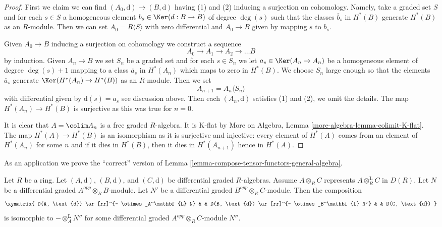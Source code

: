 \begin{proof}
First we claim we can find $(A_0, \text{d}) \to (B, \text{d})$
having (1) and (2) inducing a surjection on cohomology.
Namely, take a graded set $S$ and for each $s \in S$
a homogeneous element $b_s \in \Ker(d : B \to B)$ of degree $\deg(s)$
such that the classes $\overline{b}_s$ in $H^*(B)$
generate $H^*(B)$ as an $R$-module.
Then we can set $A_0 = R\langle S \rangle$ with zero differential
and $A_0 \to B$ given by mapping $s$ to $b_s$.

\medskip\noindent
Given $A_0 \to B$ inducing a surjection on cohomology we construct
a sequence
$$
A_0 \to A_1 \to A_2 \to \ldots B
$$
by induction. Given $A_n \to B$ we set $S_n$ be a graded set
and for each $s \in S_n$ we let $a_s \in \Ker(A_n \to A_n)$
be a homogeneous element of degree $\deg(s) + 1$
mapping to a class $\overline{a}_s$ in $H^*(A_n)$
which maps to zero in $H^*(B)$. We choose $S_n$ large enough
so that the elements $\overline{a}_s$ generate $\Ker(H^*(A_n) \to H^*(B))$
as an $R$-module. Then we set
$$
A_{n + 1} = A_n\langle S_n \rangle
$$
with differential given by $\text{d}(s) = a_s$ see discussion above.
Then each $(A_n, \text{d})$ satisfies (1) and (2), we omit the details.
The map $H^*(A_n) \to H^*(B)$ is surjective as this was true for $n = 0$.

\medskip\noindent
It is clear that $A = \colim A_n$ is a free graded $R$-algebra.
It is K-flat by More on Algebra, Lemma \ref{more-algebra-lemma-colimit-K-flat}.
The map $H^*(A) \to H^*(B)$ is an isomorphism as it is surjective
and injective: every element of $H^*(A)$ comes from an element of
$H^*(A_n)$ for some $n$ and if it dies in $H^*(B)$, then it dies
in $H^*(A_{n + 1})$ hence in $H^*(A)$.
\end{proof}

\noindent
As an application we prove the ``correct'' version of
Lemma \ref{lemma-compose-tensor-functors-general-algebra}.

\begin{lemma}
\label{lemma-compose-tensor-functors-tor}
Let $R$ be a ring. Let $(A, \text{d})$, $(B, \text{d})$, and
$(C, \text{d})$ be differential graded $R$-algebras. Assume
$A \otimes_R C$ represents $A \otimes^\mathbf{L}_R C$ in $D(R)$.
Let $N$ be a differential graded $A^{opp} \otimes_R B$-module.
Let $N'$ be a differential graded $B^{opp} \otimes_R C$-module.
Then the composition
$$
\xymatrix{
D(A, \text{d}) \ar[rr]^{- \otimes_A^\mathbf{L} N} & &
D(B, \text{d}) \ar[rr]^{- \otimes_B^\mathbf{L} N'} & &
D(C, \text{d})
}
$$
is isomorphic to $- \otimes_A^\mathbf{L} N''$ for some differential graded
$A^{opp} \otimes_R C$-module $N''$.
\end{lemma}


